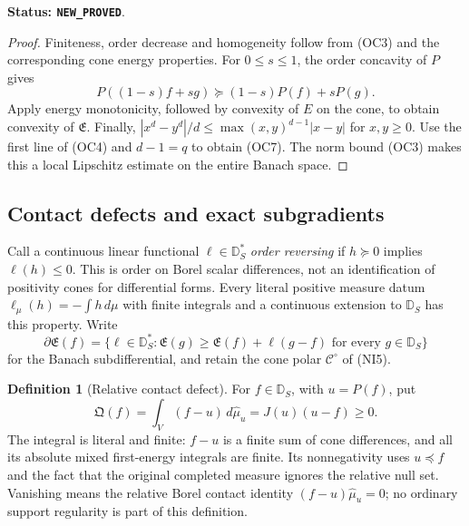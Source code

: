 \documentclass[11pt,a4paper]{article}
\numberwithin{equation}{section}
\theoremstyle{definition}
\newtheorem{definition}[theorem]{Definition}
\theoremstyle{remark}
\begin{document}
\noindent\textbf{Status: \texttt{NEW\_PROVED}}.

\begin{proof}
Finiteness, order decrease and homogeneity follow from
\textup{(OC3)} and the corresponding cone energy properties.
For $0\le s\le1$, the order concavity of $P$ gives
\[
 P((1-s)f+sg)\succeq(1-s)P(f)+sP(g).
\]
Apply energy monotonicity, followed by convexity of $E$ on
the cone, to obtain convexity of $\mathfrak E$.  Finally,
$|x^d-y^d|/d\le\max(x,y)^{d-1}|x-y|$ for $x,y\ge0$.
Use the first line of \textup{(OC4)} and $d-1=q$ to obtain
\textup{(OC7)}.  The norm bound \textup{(OC3)} makes this a
local Lipschitz estimate on the entire Banach space.
\end{proof}

\subsection{Contact defects and exact subgradients}

Call a continuous linear functional $\ell\in\mathbb D_S^*$
\emph{order reversing} if $h\succeq0$ implies $\ell(h)\le0$.
This is order on Borel scalar differences, not an identification
of positivity cones for differential forms.  Every literal
positive measure datum $\ell_\mu(h)=-\int h\,d\mu$ with finite
integrals and a continuous extension to $\mathbb D_S$ has this
property.  Write
\[
 \partial\mathfrak E(f)=\{\ell\in\mathbb D_S^*:
 \mathfrak E(g)\ge\mathfrak E(f)+\ell(g-f)
                      \text{ for every }g\in\mathbb D_S\}
 \tag{OC8}
\]
for the Banach subdifferential, and retain the cone polar
$\mathscr C^\circ$ of \textup{(NI5)}.

\begin{definition}[Relative contact defect]
\label{def:r12-relative-contact-defect}
For $f\in\mathbb D_S$, with $u=P(f)$, put
\[
 \mathfrak Q(f)=\int_V(f-u)\,d\widehat\mu_u
                         =J(u)(u-f)\ge0.
 \tag{OC9}
\]
The integral is literal and finite: $f-u$ is a finite sum of
cone differences, and all its absolute mixed first-energy
integrals are finite.  Its nonnegativity uses $u\preceq f$
and the fact that the original completed measure ignores the
relative null set.  Vanishing means the relative Borel
contact identity
$(f-u)\widehat\mu_u=0$; no ordinary support regularity is
part of this definition.
\end{definition}
\end{document}
